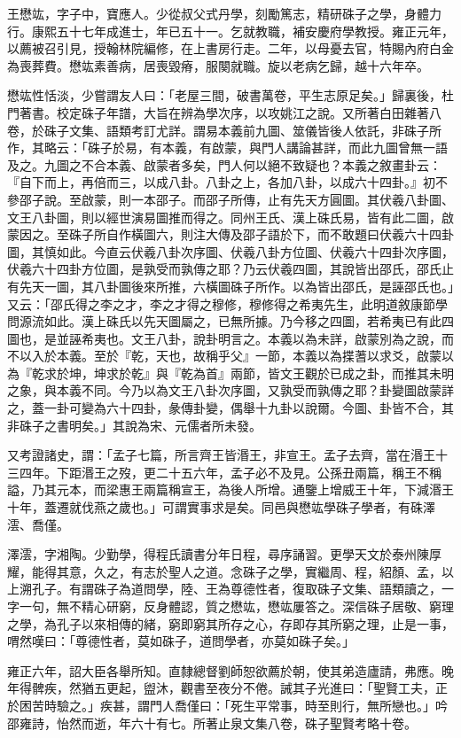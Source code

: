 \begin{pinyinscope}
王懋竑，字子中，寶應人。少從叔父式丹學，刻勵篤志，精研硃子之學，身體力行。康熙五十七年成進士，年已五十一。乞就教職，補安慶府學教授。雍正元年，以薦被召引見，授翰林院編修，在上書房行走。二年，以母憂去官，特賜內府白金為喪葬費。懋竑素善病，居喪毀瘠，服闋就職。旋以老病乞歸，越十六年卒。

懋竑性恬淡，少嘗謂友人曰：「老屋三間，破書萬卷，平生志原足矣。」歸裏後，杜門著書。校定硃子年譜，大旨在辨為學次序，以攻姚江之說。又所著白田雜著八卷，於硃子文集、語類考訂尤詳。謂易本義前九圖、筮儀皆後人依託，非硃子所作，其略云：「硃子於易，有本義，有啟蒙，與門人講論甚詳，而此九圖曾無一語及之。九圖之不合本義、啟蒙者多矣，門人何以絕不致疑也？本義之敘畫卦云：『自下而上，再倍而三，以成八卦。八卦之上，各加八卦，以成六十四卦。』初不參邵子說。至啟蒙，則一本邵子。而邵子所傳，止有先天方圓圖。其伏羲八卦圖、文王八卦圖，則以經世演易圖推而得之。同州王氏、漢上硃氏易，皆有此二圖，啟蒙因之。至硃子所自作橫圖六，則注大傳及邵子語於下，而不敢題曰伏羲六十四卦圖，其慎如此。今直云伏羲八卦次序圖、伏羲八卦方位圖、伏羲六十四卦次序圖，伏羲六十四卦方位圖，是孰受而孰傳之耶？乃云伏羲四圖，其說皆出邵氏，邵氏止有先天一圖，其八卦圖後來所推，六橫圖硃子所作。以為皆出邵氏，是誣邵氏也。」又云：「邵氏得之李之才，李之才得之穆修，穆修得之希夷先生，此明道敘康節學問源流如此。漢上硃氏以先天圖屬之，已無所據。乃今移之四圖，若希夷已有此四圖也，是並誣希夷也。文王八卦，說卦明言之。本義以為未詳，啟蒙別為之說，而不以入於本義。至於『乾，天也，故稱乎父』一節，本義以為揲蓍以求爻，啟蒙以為『乾求於坤，坤求於乾』與『乾為首』兩節，皆文王觀於已成之卦，而推其未明之象，與本義不同。今乃以為文王八卦次序圖，又孰受而孰傳之耶？卦變圖啟蒙詳之，蓋一卦可變為六十四卦，彖傳卦變，偶舉十九卦以說爾。今圖、卦皆不合，其非硃子之書明矣。」其說為宋、元儒者所未發。

又考證諸史，謂：「孟子七篇，所言齊王皆湣王，非宣王。孟子去齊，當在湣王十三四年。下距湣王之歿，更二十五六年，孟子必不及見。公孫丑兩篇，稱王不稱謚，乃其元本，而梁惠王兩篇稱宣王，為後人所增。通鑒上增威王十年，下減湣王十年，蓋遷就伐燕之歲也。」可謂實事求是矣。同邑與懋竑學硃子學者，有硃澤澐、喬僅。

澤澐，字湘陶。少勤學，得程氏讀書分年日程，尋序誦習。更學天文於泰州陳厚耀，能得其意，久之，有志於聖人之道。念硃子之學，實繼周、程，紹顏、孟，以上溯孔子。有謂硃子為道問學，陸、王為尊德性者，復取硃子文集、語類讀之，一字一句，無不精心研窮，反身體認，質之懋竑，懋竑屢答之。深信硃子居敬、窮理之學，為孔子以來相傳的緒，窮即窮其所存之心，存即存其所窮之理，止是一事，喟然嘆曰：「尊德性者，莫如硃子，道問學者，亦莫如硃子矣。」

雍正六年，詔大臣各舉所知。直隸總督劉師恕欲薦於朝，使其弟造廬請，弗應。晚年得髀疾，然猶五更起，盥沐，觀書至夜分不倦。誡其子光進曰：「聖賢工夫，正於困苦時驗之。」疾甚，謂門人喬僅曰：「死生平常事，時至則行，無所戀也。」吟邵雍詩，怡然而逝，年六十有七。所著止泉文集八卷，硃子聖賢考略十卷。


\end{pinyinscope}
